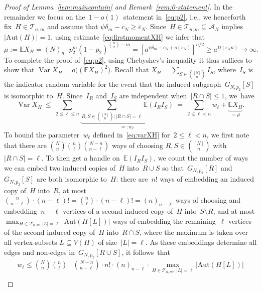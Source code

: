 \documentclass{article}
\newcommand{\eps}{\varepsilon}
\newcommand{\E}{\mathbb{E}}
\newcommand{\cA}{\mathcal{A}}
\newcommand{\cT}{\mathcal{T}}
\DeclareMathOperator{\var}{Var}
\newcommand\abs[1]{\left|#1\right|}
\newcommand{\Aut}{\mathrm{Aut}}
\newcommand{\w}{w}
\newcommand\bigpar[1]{\bigl(#1\bigr)}
\newcommand\lrsqpar[1]{\left[#1\right]}
\newcommand{\refL}[1]{Lemma~\ref{#1}}
\begin{document}
\begin{proof}[Proof of \refL{lem:maincontain} and Remark~\ref{rem:0-statement}]
In the remainder we focus on the~\mbox{$1-o(1)$ statement} in~\eqref{eq:p2}, i.e., we henceforth
fix~${H \in \cT_{n,m}}$ and assume that ${\psi\delta_m-c_N\geq\eps_N}$.
Since~${H \in \cT_{n,m} \subseteq \cA_N}$ implies~$\abs{\Aut(H)} = 1$, using estimate~\eqref{eq:firstmomentXH} we infer that 
\begin{equation}\label{eq:mu}
\mu := \E X_H = (N)_n \cdot p_2^m(1-p_2)^{\binom{n}{2}-m} = \lrsqpar{a^{\psi\delta_m-c_N+o(\eps_N)}}^{n/2} \ge a^{\Omega(\eps_N n)} \to\infty .
\end{equation}
To complete the proof of~\eqref{eq:p2}, 
using Chebyshev's inequality it thus suffices to show that ${\var X_H =o\bigpar{(\E X_H)^2}}$. 
Recall that ${X_H=\sum_{S\in \binom{[N]}{n}} I_S}$, where~$I_S$ is the indicator random variable for the event that the induced subgraph~$G_{N,p_2}[S]$ is isomorphic to~$H$. 
Since~$I_R$ and~$I_S$ are independent when~${|R \cap S| \le 1}$, we~have
\begin{equation}\label{eq:varXH}
\var X_H \: \le \: \sum_{2\le \ell \le  n}\underbrace{\sum_{R,S \in \binom{[N]}{n}: \abs{R\cap S}=\ell} \E(I_RI_S)}_{=: w_\ell} \: = \: \sum_{2\le \ell< n} \w_\ell + \underbrace{\E X_H}_{= \mu}.
\end{equation}
To bound the parameter~$\w_\ell$ defined in~\eqref{eq:varXH} for~$2 \le \ell < n$, we first note that there are $\binom{N}{n}\binom{n}{\ell}\binom{N-n}{n-\ell}$ ways of choosing $R,S\in\binom{[N]}{n}$ with $|R\cap S|=\ell$. 
To then get a handle on~$\E(I_RI_S)$, we count the number of ways we can embed two induced copies of~$H$ into~$R \cup S$ so that~$G_{N,p_2}[R]$ and~$G_{N,p_2}[S]$ are both isomorphic to~$H$: there are~$n!$ ways of embedding an induced copy of~$H$ into~$R$, at most~$\binom{n}{n-\ell} \cdot (n-\ell)! = \binom{n}{\ell} \cdot (n-\ell)! = (n)_{n-\ell}$ ways of choosing and embedding~$n-\ell$ vertices of a second induced copy of~$H$ into~$S \setminus R$, and at most $\max_{H\in \cT_{n,m},|L|=\ell} |\Aut(H[L])|$ ways of embedding the remaining~$\ell$ vertices of the second induced copy of~$H$ into~$R\cap S$, 
where the maximum is taken over all vertex-subsets $L \subseteq V(H)$ of size~$|L|=\ell$.
As these embeddings determine all edges and non-edges in~$G_{N,p_2}[R \cup S]$, it follows~that 
\begin{equation}\label{eq:generalineq0}
\begin{split}
	\w_\ell \le \binom{N}{n}\binom{n}{\ell} & \binom{N-n}{n-\ell}  \cdot n! \cdot  (n)_{n-\ell} \cdot \max_{H\in \cT_{n,m}, \: \abs{L}=\ell} |\Aut(H[L])| \\

\end{split}
\end{equation}
\end{proof}
\end{document}
